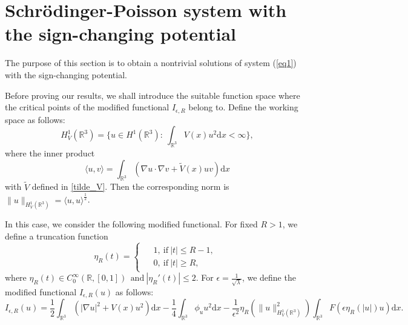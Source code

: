 \documentclass[12pt]{amsart}
\numberwithin{equation}{section}
\theoremstyle{definition}
\begin{document}
\section{ Schr\"{o}dinger-Poisson system with the sign-changing potential}

The purpose of this section is to obtain a nontrivial solutions of system (\ref{eq1}) with the sign-changing potential.

Before proving our results, we shall introduce the suitable function space where the critical points of the modified functional $I_{\epsilon,R}$ belong to. Define the working space as follows:
$$H^{1}_{V}(\mathbb{R}^3)=\{u\in H^{1}(\mathbb{R}^3):~\int_{\mathbb{R}^3}V(x)u^{2}\text{d}x<\infty \},$$
where the inner product
$$\langle u,v\rangle=\int_{\mathbb{R}^3}\left(\nabla u\cdot\nabla v+\tilde V(x)u v\right)\text{d}x$$ with $\tilde V$ defined in \eqref{tilde_V}.
Then the corresponding norm is $\|u\|_{H^{1}_{V}(\mathbb{R}^3)}=\langle u,u\rangle^{\frac{1}{2}}$.

In this case, we consider the following modified functional. For fixed $R> 1$, we define a truncation function
\begin{equation*}
	\eta _{R}\left ( t \right )=\left\{\begin{matrix}
    \begin{aligned}
        &1,~\text{if}~\left| t\right|\leq R-1,\\
    &0,~\text{if}~\left| t\right|\geq R,
    \end{aligned}
    \end{matrix}\right.
\end{equation*}
where $\eta _{R}\left ( t \right )\in C_0^{\infty}(\mathbb{R},\left [ 0,1 \right ])~~\text{and}~\left | \eta _{R}'\left ( t \right )\right | \leq 2$. For $\epsilon =\frac{1}{\sqrt{\lambda }}$, we define the modified functional $I_{\epsilon,R}\left ( u\right )$ as follows:
\begin{equation*}
    I_{\epsilon,R }\left ( u \right )=\frac{1}{2}\int_{\mathbb{R}^3}\left(|\nabla u|^{2}+V(x)u^2\right)\text{d}x-\frac{1}{4}\int_{\mathbb{R}^{3}}\phi _{u}u^{2}\text{d}x-\frac{1}{\epsilon ^{2}}\eta _{R}\left (\|u\|^{2}_{H^1_{V}(\mathbb{R}^3)}\right )\int_{\mathbb{R}^{3}}F\left (\epsilon \eta _{R} \left ( \left | u\right |\right )u\right )\text{d}x.
\end{equation*}
\end{document}
